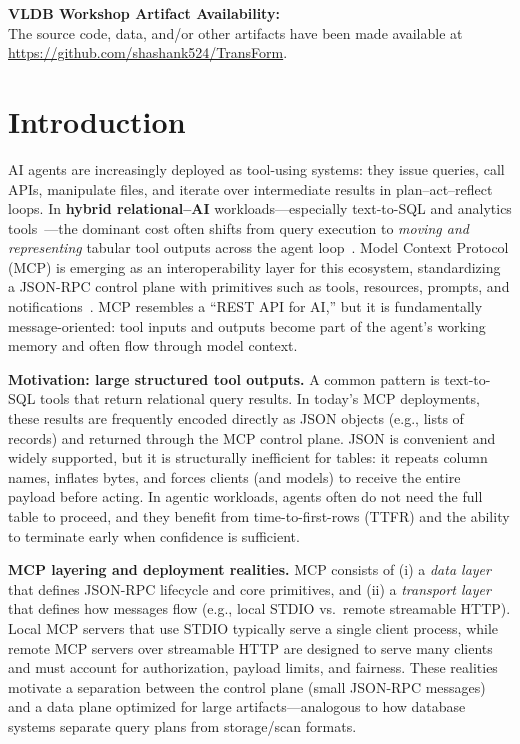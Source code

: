 \documentclass[sigconf, nonacm]{acmart}
\begin{document}
\vspace{.2cm}
\begingroup\small\noindent\raggedright\textbf{VLDB Workshop Artifact Availability:}\\
The source code, data, and/or other artifacts have been made available at \url{https://github.com/shashank524/TransForm}.
\endgroup

\section{Introduction}
\label{sec:intro}

AI agents are increasingly deployed as tool-using systems: they issue queries, call APIs, manipulate files, and iterate over intermediate results in plan--act--reflect loops. In \textbf{hybrid relational--AI} workloads---especially text-to-SQL and analytics tools~\cite{nl2sqlSurveyTkde2025,birdSqlNeurips2023}---the dominant cost often shifts from query execution to \emph{moving and representing} tabular tool outputs across the agent loop~\cite{liuAgentFirstOverlords,fireboltAgentsWhitepaper}. Model Context Protocol (MCP) is emerging as an interoperability layer for this ecosystem, standardizing a JSON-RPC control plane with primitives such as tools, resources, prompts, and notifications~\cite{guoMcpEcosystemMeasurement}. MCP resembles a ``REST API for AI,'' but it is fundamentally message-oriented: tool inputs and outputs become part of the agent's working memory and often flow through model context.

\smallskip
\noindent\textbf{Motivation: large structured tool outputs.}
A common pattern is text-to-SQL tools that return relational query results. In today's MCP deployments, these results are frequently encoded directly as JSON objects (e.g., lists of records) and returned through the MCP control plane. JSON is convenient and widely supported, but it is structurally inefficient for tables: it repeats column names, inflates bytes, and forces clients (and models) to receive the entire payload before acting. In agentic workloads, agents often do not need the full table to proceed, and they benefit from time-to-first-rows (TTFR) and the ability to terminate early when confidence is sufficient.

\smallskip
\noindent\textbf{MCP layering and deployment realities.}
MCP consists of (i) a \emph{data layer} that defines JSON-RPC lifecycle and core primitives, and (ii) a \emph{transport layer} that defines how messages flow (e.g., local STDIO vs.\ remote streamable HTTP). Local MCP servers that use STDIO typically serve a single client process, while remote MCP servers over streamable HTTP are designed to serve many clients and must account for authorization, payload limits, and fairness. These realities motivate a separation between the control plane (small JSON-RPC messages) and a data plane optimized for large artifacts---analogous to how database systems separate query plans from storage/scan formats.
\end{document}
